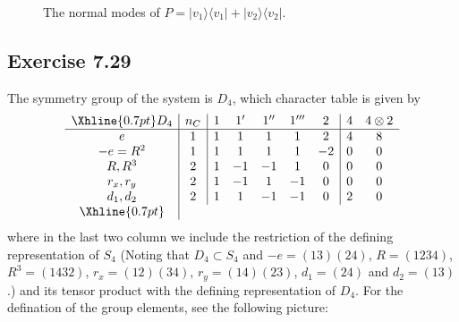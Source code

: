 \documentclass[]{ctexart}
\begin{document}
\begin{figure}[h]
	\caption{The normal modes of $P=|v_1\rangle\langle v_1|+|v_2\rangle\langle v_2|$.}
\end{figure}


\subsection{Exercise 7.29}
The symmetry group of the system is $D_4$, which character table is given by 
\begin{equation*}
\begin{array}{c|c|ccccc|cc}
\Xhline{0.7pt}
D_4 & n_C & 1 & 1' & 1'' & 1''' & 2 & 4 & 4\otimes 2\\
\hline 
e & 1 & 1 & 1 & 1 & 1 & 2 & 4 & 8\\
-e=R^2 & 1 & 1 & 1 & 1 & 1 & -2 & 0 & 0\\
R,R^3 & 2 & 1 & -1 & -1 & 1 & 0 & 0 & 0\\
r_x, r_y & 2 & 1 & -1 & 1 & -1 & 0 & 0 & 0\\
d_1, d_2 & 2 & 1 & 1 & -1 & -1 & 0 & 2 & 0\\
\Xhline{0.7pt}
\end{array}
\end{equation*}
where in the last two column we include the restriction of the defining representation of $S_4$ (Noting that $D_4\subset S_4$ and $-e=(13)(24)$, $R=(1234)$, 
$R^3=(1432)$, $r_x=(12)(34)$, $r_y=(14)(23)$, $d_1=(24)$ and $d_2=(13)$.) and its tensor product with the defining representation 
of $D_4$. For the defination of the group elements, see the following picture: 
\end{document}
